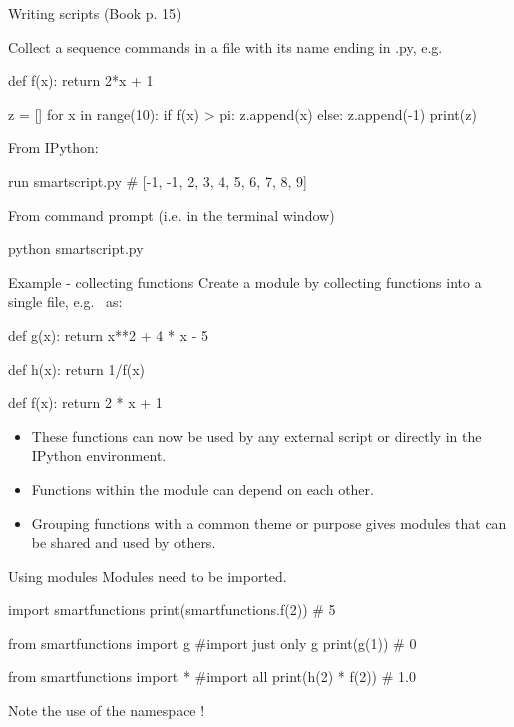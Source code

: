 \documentclass[hyperref={pdfpagelabels=false},table, handout]{beamer}
\begin{document}
\begin{frame}[fragile]{Writing scripts (Book p. 15)}

Collect a sequence commands in a file with its name ending in \alert{.py}, e.g.\ 
\begin{python}
def f(x):
  return 2*x + 1

z = []
for x in range(10):
  if f(x) > pi:
    z.append(x)
  else:
    z.append(-1)
print(z)
\end{python}

\pause

From IPython:
\begin{python}
run smartscript.py # [-1, -1, 2, 3, 4, 5, 6, 7, 8, 9]
\end{python}

\pause

From command prompt (i.e. in the terminal window)
\begin{python}
python smartscript.py
\end{python}

\end{frame}



\begin{frame}[fragile]{Example - collecting functions}
Create a \alert{module} by collecting functions into a single file, e.g.\  as:
\begin{python}
def g(x):
  return x**2 + 4 * x - 5

def h(x):
  return 1/f(x)

def f(x):
  return 2 * x + 1
\end{python}
\begin{itemize}
\item These functions can now be used by any external script or directly in the IPython environment.
\item Functions within the module can depend on each other.
\item Grouping functions with a common theme or purpose gives modules that can be shared and used by others.
\end{itemize}
\end{frame}


\begin{frame}[fragile]{Using modules \hspace*{\fill}}
Modules need to be imported.
\begin{python}
import smartfunctions
print(smartfunctions.f(2)) # 5

from smartfunctions import g  #import just only g
print(g(1)) # 0

from smartfunctions import * #import all
print(h(2) * f(2)) # 1.0
\end{python}
{\small Note the use of the namespace !}
\end{frame}
\end{document}
